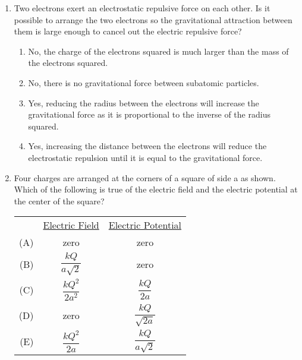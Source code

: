 \documentclass{../../../oss-apphys}
\begin{document}
\begin{multicols*}{2}
\begin{enumerate}[leftmargin=18pt]
   \item Two electrons exert an electrostatic repulsive force on each other. Is
     it possible to arrange the two electrons so the gravitational attraction
     between them is large enough to cancel out the electric repulsive force?
     \begin{enumerate}[nosep,leftmargin=18pt,label=(\Alph*)]
     \item  No, the charge of the electrons squared is much larger than the
       mass of the electrons squared.
     \item No, there is no gravitational force between subatomic particles.
     \item Yes, reducing the radius between the electrons will increase the
       gravitational force as it is proportional to the inverse of the radius
       squared.
     \item Yes, increasing the distance between the electrons will reduce the
       electrostatic repulsion until it is equal to the gravitational force.
     \end{enumerate}
     \columnbreak
     
  \item Four charges are arranged at the corners of a square of side a as shown.
    Which of the following is true of the electric field and the electric
    potential at the center of the square?
    \begin{center}
    \end{center}
    \begin{tabular}{rcc}
      & \underline{Electric Field} & \underline{Electric Potential}\\
      (A) & zero & zero \\
      (B) & $\dfrac{kQ}{a\sqrt{2}}$ & zero \\
      (C) & $\dfrac{kQ^2}{2a^2}$ &  $\dfrac{kQ}{2a}$\\
      (D) & zero &  $\dfrac{kQ}{\sqrt{2a}}$\\
      (E) & $\dfrac{kQ^2}{2a}$ & $\dfrac{kQ}{a\sqrt{2}}$
    \end{tabular}
    

\end{enumerate}
\end{multicols*}
\end{document}
